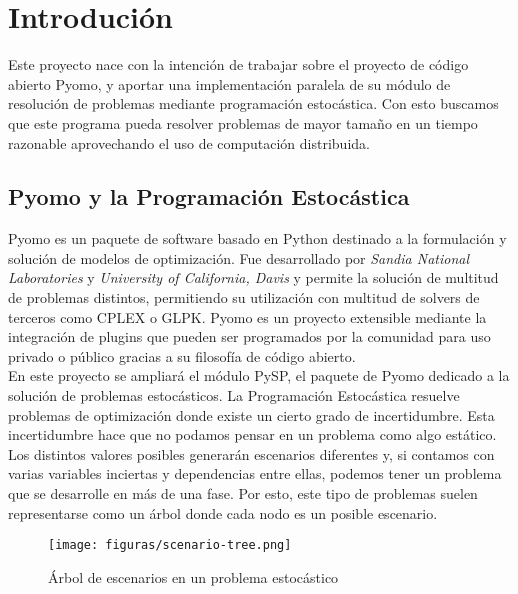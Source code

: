 \chapter{Introdución}

Este proyecto nace con la intención de trabajar sobre el proyecto de código abierto Pyomo, y aportar una implementación paralela de su módulo de resolución de problemas mediante programación estocástica. Con esto buscamos que este programa pueda resolver problemas de mayor tamaño en un tiempo razonable aprovechando el uso de computación distribuida.

\section{Pyomo y la Programación Estocástica}


Pyomo \cite{pyomo} es un paquete de software basado en Python destinado a la formulación y solución de modelos de optimización. Fue desarrollado por \textit{Sandia National Laboratories} y \textit{University of California, Davis} y permite la solución de multitud de problemas distintos, permitiendo su utilización con multitud de solvers de terceros como CPLEX o GLPK. Pyomo es un proyecto extensible mediante la integración de plugins que pueden ser programados por la comunidad para uso privado o público gracias a su filosofía de código abierto.\\

En este proyecto se ampliará el módulo PySP, el paquete de Pyomo dedicado a la solución de problemas estocásticos. La Programación Estocástica \cite{stochasticProgramming} resuelve problemas de optimización donde existe un cierto grado de incertidumbre. Esta incertidumbre hace que no podamos pensar en un problema como algo estático. Los distintos valores posibles generarán escenarios diferentes y, si contamos con varias variables inciertas y dependencias entre ellas, podemos tener un problema que se desarrolle en más de una fase. Por esto, este tipo de problemas suelen representarse como un árbol donde cada nodo es un posible escenario.\\

\begin{figure}[H]
    \centerline{\texttt{[image: figuras/scenario-tree.png]}}
    \caption{Árbol de escenarios en un problema estocástico}
    \label{fig:scenario-tree}
\end{figure}

